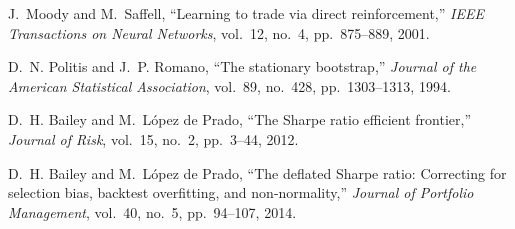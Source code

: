 
J.~Moody and M.~Saffell, ``Learning to trade via direct reinforcement,'' \emph{IEEE Transactions on Neural Networks}, vol.~12, no.~4, pp.~875--889, 2001.

D.~N. Politis and J.~P. Romano, ``The stationary bootstrap,'' \emph{Journal of the American Statistical Association}, vol.~89, no.~428, pp.~1303--1313, 1994.

D.~H. Bailey and M.~L{\'o}pez de Prado, ``The Sharpe ratio efficient frontier,'' \emph{Journal of Risk}, vol.~15, no.~2, pp.~3--44, 2012.

D.~H. Bailey and M.~L{\'o}pez de Prado, ``The deflated Sharpe ratio: Correcting for selection bias, backtest overfitting, and non-normality,'' \emph{Journal of Portfolio Management}, vol.~40, no.~5, pp.~94--107, 2014.
